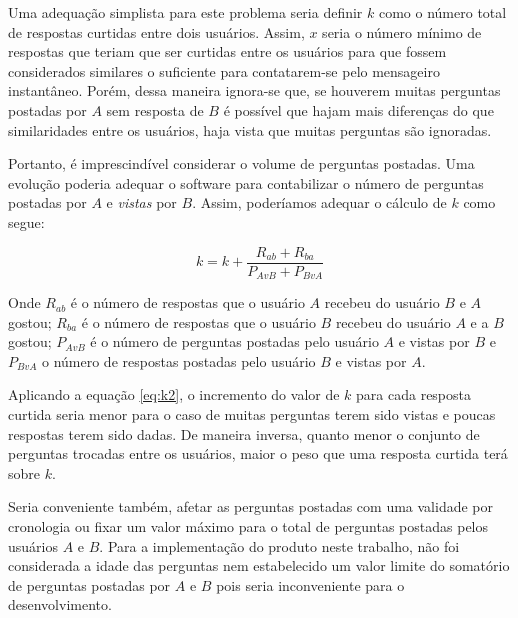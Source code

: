 Uma adequação simplista para este problema seria definir $k$ como o número total de respostas curtidas entre dois usuários. Assim, $x$ seria o número mínimo de respostas que teriam que ser curtidas entre os usuários para que fossem considerados similares o suficiente para contatarem-se pelo mensageiro instantâneo. Porém, dessa maneira ignora-se que, se houverem muitas perguntas postadas por $A$ sem resposta de $B$ é possível que hajam mais diferenças do que similaridades entre os usuários, haja vista que muitas perguntas são ignoradas.

Portanto, é imprescindível considerar o volume de perguntas postadas. Uma evolução poderia adequar o software para contabilizar o número de perguntas postadas por $A$ e \emph{vistas} por $B$. Assim, poderíamos adequar o cálculo de $k$ como segue: 

\begin{equation}
k = k + \frac{R_{ab} + R_{ba}}{P_{AvB} + P_{BvA}} 
\label{eq:k2}
\end{equation}

Onde $R_{ab}$ é o número de respostas que o usuário $A$ recebeu do usuário $B$ e $A$ gostou; $R_{ba}$ é o número de respostas que o usuário $B$ recebeu do usuário $A$ e a $B$ gostou; $P_{AvB}$ é o número de perguntas postadas pelo usuário $A$ e vistas por $B$ e $P_{BvA}$ o número de respostas postadas pelo usuário $B$ e vistas por $A$.

Aplicando a equação \ref{eq:k2}, o incremento do valor de $k$ para cada resposta curtida seria menor para o caso de muitas perguntas terem sido vistas e poucas respostas terem sido dadas. De maneira inversa, quanto menor o conjunto de perguntas trocadas entre os usuários, maior o peso que uma resposta curtida terá sobre $k$.

Seria conveniente também, afetar as perguntas postadas com uma validade por cronologia ou fixar um valor máximo para o total de perguntas postadas pelos usuários $A$ e $B$. Para a implementação do produto neste trabalho, não foi considerada a idade das perguntas nem estabelecido um valor limite do somatório de perguntas postadas por $A$ e $B$ pois seria inconveniente para o desenvolvimento.




